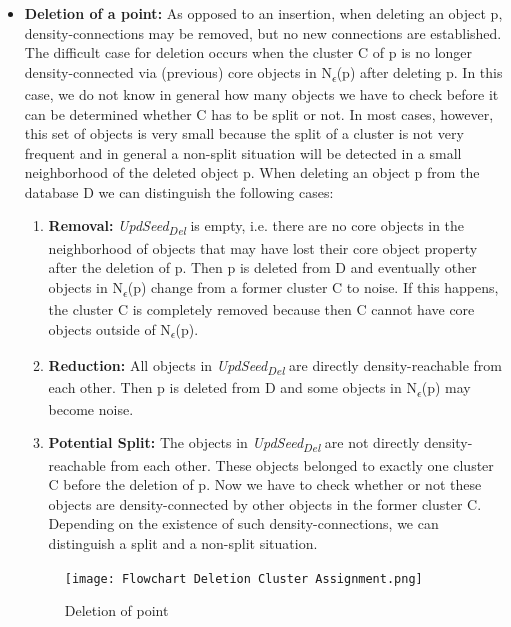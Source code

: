 \documentclass[acmsmall]{acmart}
\begin{document}
\begin{enumerate}
\begin{itemize}
        \item \textbf{Deletion of a point: }
        As opposed to an insertion, when deleting an object p, density-connections may be removed, but no new connections are established. The difficult case for deletion occurs when the cluster C of p is no longer density-connected via (previous) core objects in N\textsubscript{$\epsilon$}(p) after deleting p. In this case, we do not know in general how many objects we have to check before it can be determined whether C has to be split or not. In most cases, however, this set of objects is very small because the split of a cluster is not very frequent and in general a non-split situation will be detected in a small neighborhood of the deleted object p. 
        When deleting an object p from the database D we can distinguish the following cases:
        \\ 
        \begin{enumerate}
            \item \textbf{Removal: } \textit{UpdSeed\textsubscript{Del}} is empty, i.e. there are no core objects in the neighborhood of objects that may have lost their core object property after the deletion of p. Then p is deleted from D and eventually other objects in N\textsubscript{$\epsilon$}(p) change from a former cluster C to noise. If this happens, the cluster C is completely removed because then C cannot have core objects outside of N\textsubscript{$\epsilon$}(p).
            \item \textbf{Reduction: } All objects in \textit{UpdSeed\textsubscript{Del}} are directly density-reachable
            from each other. Then p is deleted from D and some objects in N\textsubscript{$\epsilon$}(p) may become noise.
            \item \textbf{Potential Split: } The objects in \textit{UpdSeed\textsubscript{Del}} are not directly density-reachable from each other. These objects belonged to exactly one cluster C before the deletion of p. Now we have to check whether or not these objects are density-connected by other objects in the former cluster C. Depending on the existence of such density-connections, we can distinguish a split and a non-split situation.
        \end{enumerate}
        
        \begin{figure}[!h]
            \centering
            \texttt{[image: Flowchart Deletion Cluster Assignment.png]}
            \caption{Deletion of point}
            \label{fig:my_label}
        \end{figure}
    \end{itemize}
\end{enumerate}
\end{document}
